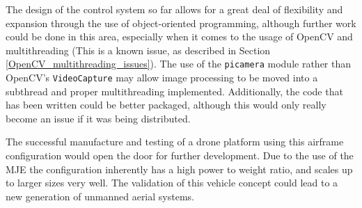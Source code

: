 \documentclass[11pt,twoside]{article}
\begin{document}
The design of the control system so far allows for a great deal of flexibility and expansion through the use of object-oriented programming, although further work could be done in this area, especially when it comes to the usage of OpenCV and multithreading (This is a known issue, as described in Section \ref{OpenCV_multithreading_issues}). The use of the \lstinline|picamera| module rather than OpenCV's \lstinline|VideoCapture| may allow image processing to be moved into a subthread and proper multithreading implemented. Additionally, the code that has been written could be better packaged, although this would only really become an issue if it was being distributed.

The successful manufacture and testing of a drone platform using this airframe configuration would open the door for further development. Due to the use of the MJE the configuration inherently has a high power to weight ratio, and scales up to larger sizes very well\cite{Ismail_paper}. The validation of this vehicle concept could lead to a new generation of unmanned aerial systems.




\newpage
\appendix
\end{document}
